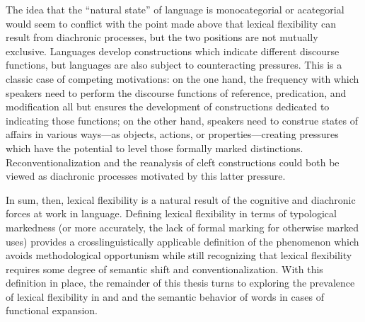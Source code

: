 The idea that the \enquote{natural state} of language is monocategorial or acategorial would seem to conflict with the point made above that lexical flexibility can result from diachronic processes, but the two positions are not mutually exclusive. Languages develop constructions which indicate different discourse functions, but languages are also subject to counteracting pressures. This is a classic case of competing motivations: on the one hand, the frequency with which speakers need to perform the discourse functions of reference, predication, and modification all but ensures the development of constructions dedicated to indicating those functions; on the other hand, speakers need to construe states of affairs in various ways—as objects, actions, or properties—creating pressures which have the potential to level those formally marked distinctions. Reconventionalization and the reanalysis of cleft constructions could both be viewed as diachronic processes motivated by this latter pressure.

In sum, then, lexical flexibility is a natural result of the cognitive and diachronic forces at work in language. Defining lexical flexibility in terms of typological markedness (or more accurately, the lack of formal marking for otherwise marked uses) provides a crosslinguistically applicable definition of the phenomenon which avoids methodological opportunism while still recognizing that lexical flexibility requires some degree of semantic shift and conventionalization. With this definition in place, the remainder of this thesis turns to exploring the prevalence of lexical flexibility in  and  and the semantic behavior of words in cases of functional expansion.
